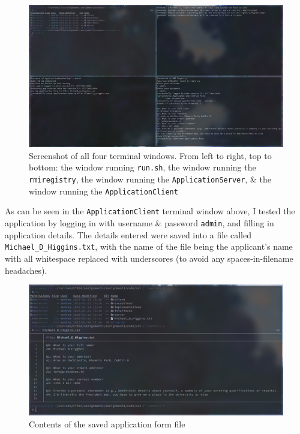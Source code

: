 \documentclass[a4paper]{article}
\begin{document}
\begin{figure}[H]
    \centering
    \includegraphics[width=\textwidth]{./images/screenshot.png}
    \caption{Screenshot of all four terminal windows. From left to right, top to bottom: the window running \texttt{run.sh}, the window running the \texttt{rmiregistry}, the window running the \texttt{ApplicationServer}, \& the window running the \texttt{ApplicationClient}}
\end{figure}

As can be seen in the \texttt{ApplicationClient} terminal window above, I tested the application by logging in with username \& password \verb|admin|, and filling in application details.
The details entered were saved into a file called \verb|Michael_D_Higgins.txt|, with the name of the file being the applicant's name with all whitespace replaced with underscores (to avoid any spaces-in-filename headaches).

\begin{figure}[H]
    \centering
    \includegraphics[width=\textwidth]{./images/michaeld.png}
    \caption{Contents of the saved application form file}
\end{figure}
\end{document}
